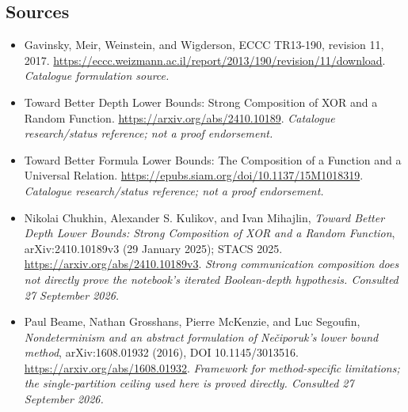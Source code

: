 \documentclass[11pt,a4paper]{article}
\numberwithin{equation}{section}
\begin{document}
\subsection{Sources}
\begin{itemize}\raggedright
\item[\textnormal{[S1]}]\hypertarget{source:69:1}{} Gavinsky, Meir, Weinstein, and Wigderson, ECCC TR13-190, revision 11, 2017.
\url{https://eccc.weizmann.ac.il/report/2013/190/revision/11/download}.
{\small\textit{Catalogue formulation source.}}
\item[\textnormal{[S2]}]\hypertarget{source:69:2}{} Toward Better Depth Lower Bounds: Strong Composition of XOR and a Random Function.
\url{https://arxiv.org/abs/2410.10189}.
{\small\textit{Catalogue research/status reference; not a proof endorsement.}}
\item[\textnormal{[S3]}]\hypertarget{source:69:3}{} Toward Better Formula Lower Bounds: The Composition of a Function and a Universal Relation.
\url{https://epubs.siam.org/doi/10.1137/15M1018319}.
{\small\textit{Catalogue research/status reference; not a proof endorsement.}}

\item[\textnormal{[E1]}]\hypertarget{extra:69:1}{} Nikolai Chukhin, Alexander S. Kulikov, and Ivan Mihajlin, \emph{Toward Better Depth Lower Bounds: Strong Composition of XOR and a Random Function}, arXiv:2410.10189v3 (29 January 2025); STACS 2025.
\url{https://arxiv.org/abs/2410.10189v3}.
{\small\textit{Strong communication composition does not directly prove the notebook's iterated Boolean-depth hypothesis. Consulted 27 September 2026.}}
\item[\textnormal{[E2]}]\hypertarget{extra:69:2}{} Paul Beame, Nathan Grosshans, Pierre McKenzie, and Luc Segoufin, \emph{Nondeterminism and an abstract formulation of Nečiporuk's lower bound method}, arXiv:1608.01932 (2016), DOI 10.1145/3013516.
\url{https://arxiv.org/abs/1608.01932}.
{\small\textit{Framework for method-specific limitations; the single-partition ceiling used here is proved directly. Consulted 27 September 2026.}}
\end{itemize}
\end{document}
